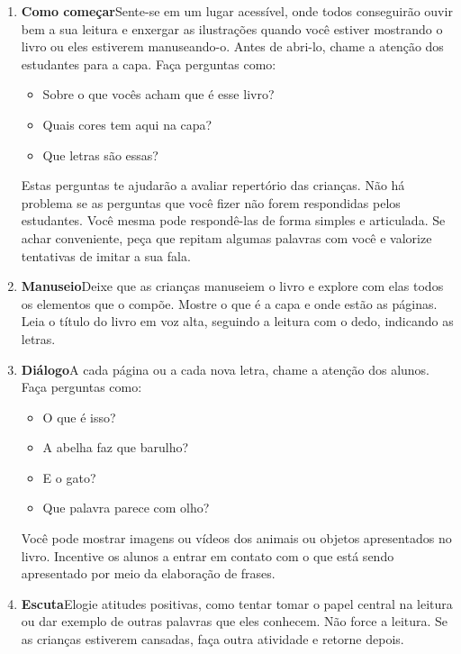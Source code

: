 \documentclass[11pt]{extarticle}
\begin{document}
\begin{enumerate}
\item \textbf{Como começar}\quad Sente-se em um lugar acessível, 
onde todos conseguirão ouvir bem a sua leitura e enxergar as ilustrações 
quando você estiver mostrando o livro ou eles estiverem manuseando-o. 
Antes de abri-lo, chame a atenção dos estudantes para a capa. 
Faça perguntas como: 

\begin{itemize}
\item Sobre o que vocês acham que é esse livro?
\item Quais cores tem aqui na capa?
\item Que letras são essas?
\end{itemize}

Estas perguntas te ajudarão a avaliar repertório das crianças. 
Não há problema se as perguntas que você fizer não forem respondidas pelos 
estudantes. Você mesma pode respondê-las de forma simples e articulada. Se achar 
conveniente, peça que repitam algumas palavras com você e valorize tentativas 
de imitar a sua fala. 
 
\item \textbf{Manuseio}\quad Deixe que as crianças manuseiem o livro 
e explore com elas todos os elementos que o compõe. Mostre o que é a 
capa e onde estão as páginas. Leia o título do livro em voz alta, seguindo 
a leitura com o dedo, indicando as letras. 

\item \textbf{Diálogo}\quad A cada página ou a cada nova letra,
chame a atenção dos alunos. Faça perguntas como:

\begin{itemize}
\item O que é isso?
\item A abelha faz que barulho?
\item E o gato?
\item Que palavra parece com olho?
\end{itemize}

Você pode mostrar imagens ou vídeos dos animais ou objetos
apresentados no livro. Incentive os alunos a entrar
em contato com o que está sendo apresentado por meio da 
elaboração de frases. 

\item \textbf{Escuta}\quad Elogie atitudes positivas, como 
tentar tomar o papel central na leitura ou dar exemplo de outras
palavras que eles conhecem. Não force a leitura. Se as crianças 
estiverem cansadas, faça outra atividade e retorne depois. 


\end{enumerate}
\end{document}
